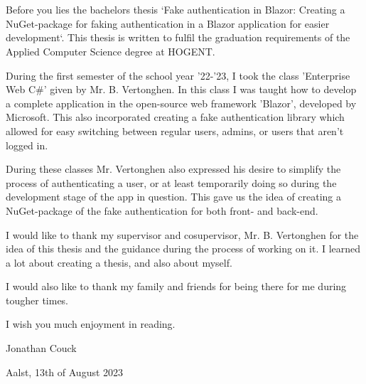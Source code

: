 
\chapter*{}%
\label{ch:voorwoord}


Before you lies the bachelors thesis `Fake authentication in Blazor: Creating a NuGet-package for faking authentication in a Blazor application for easier development`. This thesis is written to fulfil the graduation requirements of the  Applied Computer Science degree at HOGENT.

During the first semester of the school year '22-'23, I took the class 'Enterprise Web C\#' given by Mr. B. Vertonghen. In this class I was taught how to develop a complete application in the open-source web framework 'Blazor', developed by Microsoft. This also incorporated creating a fake authentication library which allowed for easy switching between regular users, admins, or users that aren't logged in.

During these classes Mr. Vertonghen also expressed his desire to simplify the process of authenticating a user, or at least temporarily doing so during the development stage of the app in question. This gave us the idea of creating a NuGet-package of the fake authentication for both front- and back-end.

I would like to thank my supervisor and cosupervisor, Mr. B. Vertonghen for the idea of this thesis and the guidance during the process of working on it. I learned a lot about creating a thesis, and also about myself.

I would also like to thank my family and friends for being there for me during tougher times.

I wish you much enjoyment in reading.

Jonathan Couck

Aalst, 13th of August 2023

